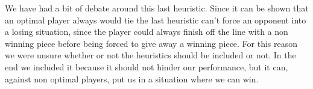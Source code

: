 We have had a bit of debate around this last heuristic. Since it can be shown
that an optimal player always would tie the last heuristic can't force an opponent
into a losing situation, since the player could always finish off the line with
a non winning piece before being forced to give away a winning piece. For this
reason we were unsure whether or not the heuristics should be included or not.
In the end we included it because it should not hinder our performance, but
it can, against non optimal players, put us in a situation where we can win.


